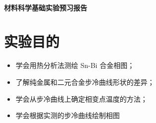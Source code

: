 \documentclass[a4paper,utf8]{article}
\begin{document}
\begin{center}
    {\mbox{}\\[7em]\bfseries\songti%
    材料科学基础实验预习报告}\\[34mm]
\end{center}
\newpage
\section{实验目的}
    \begin{itemize}
        \item 学会用热分析法测绘 Sn-Bi 合金相图；
        \item 了解纯金属和二元合金步冷曲线形状的差异；
        \item 学会从步冷曲线上确定相变点温度的方法；
        \item 学会根据实测的步冷曲线绘制相图
    \end{itemize}
\end{document}
